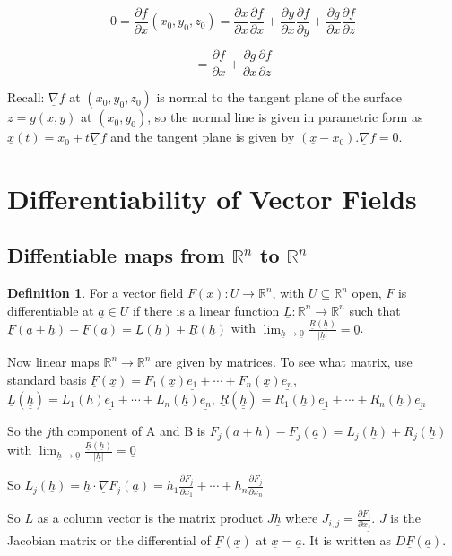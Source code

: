 \documentclass[12pt,a4paper]{article}
\theoremstyle{definition}
\newtheorem{definition}{Definition}[subsection]
\begin{document}
\[0 = \frac{\partial f}{\partial x} (x_0, y_0, z_0) = \frac{\partial x}{\partial x} \frac{\partial f}{\partial x} + \frac{\partial y}{\partial x}\frac{\partial f}{\partial y} + \frac{\partial g}{\partial x}\frac{\partial f}{\partial z}\]

\[= \frac{\partial f}{\partial x} + \frac{\partial g}{\partial x}\frac{\partial f}{\partial z}\]

Recall: $\underline{\nabla} f$ at $(x_0, y_0, z_0)$ is normal to the tangent plane of the surface $z = g(x, y)$ at $(x_0, y_0)$, so the normal line is given in parametric form as $\underline{x}(t) = x_0 + t \underline{\nabla} f$ and the tangent plane is given by $(\underline{x} - x_0) . \underline{\nabla} f = 0$.

\section{Differentiability of Vector Fields}

\subsection{Diffentiable maps from $\mathbb{R}^n$ to $\mathbb{R}^n$}

\begin{definition}
	For a vector field $\underline{F}(\underline{x}): U \rightarrow \mathbb{R}^n$, with $U \subseteq \mathbb{R}^n$ open, $F$ is differentiable at $\underline{a} \in U$ if there is a linear function $\underline{L}: \mathbb{R}^n \rightarrow \mathbb{R}^n$ such that $\underline{F}(\underline{a} + \underline{h}) - \underline{F}(\underline{a}) = \underline{L}(\underline{h}) + \underline{R}(\underline{h})$ with $\lim_{\underline{h} \rightarrow \underline{0}} \frac{\underline{R}(\underline{h})}{|\underline{h}|} = \underline{0}$.

	Now linear maps $\mathbb{R}^n \rightarrow \mathbb{R}^n$ are given by matrices. To see what matrix, use standard basis $\underline{F}(\underline{x}) = F_1(\underline{x}) \underline{e_1} + \cdots + F_n(\underline{x}) \underline{e_n}$, $\underline{L}(\underline{\underline{h}}) = L_1(h) \underline{e_1} + \cdots + L_n(\underline{h}) \underline{e_n}$, $\underline{R}(\underline{\underline{h}}) = R_1(\underline{h}) \underline{e_1} + \cdots + R_n(\underline{h}) \underline{e_n}$

	So the $j$th component of A and B is $F_j(\underline{a + h}) - F_j(\underline{a}) = L_j(\underline{h}) + R_j(\underline{h})$ with $\lim_{\underline{h} \rightarrow \underline{0}} \frac{\underline{R}(\underline{h})}{|\underline{h}|} = \underline{0}$

	So $L_j(\underline{h}) = \underline{h} \cdot \underline{\nabla} F_j(\underline{a}) = h_1 \frac{\partial F_j}{\partial x_1} + \cdots + h_n \frac{\partial F_j}{\partial x_n}$

	So $L$ as a column vector is the matrix product $J \underline{h}$ where $J_{i, j} = \frac{\partial F_i}{\partial x_j}$. $J$ is the Jacobian matrix or the differential of $\underline{F}(\underline{x})$ at $\underline{x} = \underline{a}$. It is written as $D\underline{F}(\underline{a})$.
\end{definition}
\end{document}
